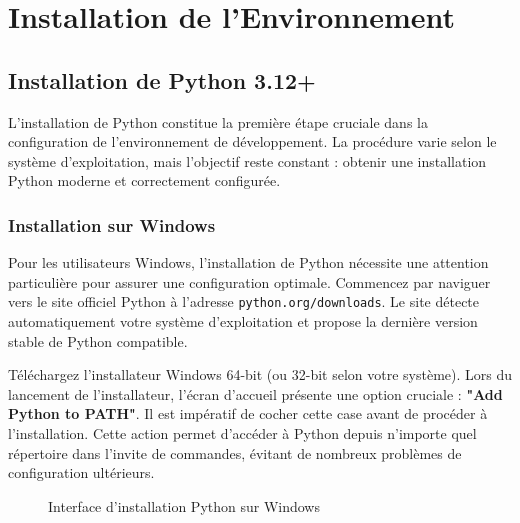 \section{Installation de l'Environnement}

\subsection{Installation de Python 3.12+}

L'installation de Python constitue la première étape cruciale dans la configuration de l'environnement de développement. La procédure varie selon le système d'exploitation, mais l'objectif reste constant : obtenir une installation Python moderne et correctement configurée.

\subsubsection{Installation sur Windows}

Pour les utilisateurs Windows, l'installation de Python nécessite une attention particulière pour assurer une configuration optimale. Commencez par naviguer vers le site officiel Python à l'adresse \texttt{python.org/downloads}. Le site détecte automatiquement votre système d'exploitation et propose la dernière version stable de Python compatible.

Téléchargez l'installateur Windows 64-bit (ou 32-bit selon votre système). Lors du lancement de l'installateur, l'écran d'accueil présente une option cruciale : \textbf{"Add Python to PATH"}. Il est impératif de cocher cette case avant de procéder à l'installation. Cette action permet d'accéder à Python depuis n'importe quel répertoire dans l'invite de commandes, évitant de nombreux problèmes de configuration ultérieurs.

\begin{figure}[h]
\centering
{}
\caption{Interface d'installation Python sur Windows}
\end{figure}

